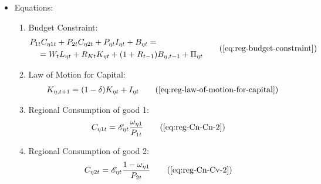 \documentclass[../thesis.tex]{subfiles}
\begin{document}
{\begin{itemize}
		\item Equations:
		
	\begin{enumerate}

		\item Budget Constraint:
		\begin{align}
		\begin{split}
			& P_{1 t} C_{\eta 1 t} + P_{2 t} C_{\eta 2 t} + P_{\eta t} I_{\eta t} + B_{\eta t} = \\ & \quad = W_t L_{\eta t} + R_{Kt} K_{\eta t} + (1 + R_{t-1}) B_{\eta,t-1} + \Pi_{\eta t}
		\end{split} \tag{\ref{eq:reg-budget-constraint}}
		\end{align}

		\item Law of Motion for Capital:
		\begin{align}
			K_{\eta, t+1} = (1-\delta)K_{\eta t} + I_{\eta t} \tag{\ref{eq:reg-law-of-motion-for-capital}}
		\end{align}

		\item Regional Consumption of good 1:
		\begin{align}
			C_{\eta 1 t} &= \te \frac{\omega_{\eta 1}}{P_{1 t}} \tag{\ref{eq:reg-Cn-Cn-2}}
		\end{align}

		\item Regional Consumption of good 2:
		\begin{align}
			C_{\eta 2 t} &= \te \frac{1 -\omega_{\eta 1}}{P_{2 t}} \tag{\ref{eq:reg-Cn-Cv-2}}
		\end{align}

\begin{comment}
	
	\item Regional Consumption:
	\begin{align}
		C_{\eta t} = C_{\eta 1 t}^{\omega_{\eta 1}} C_{\eta 2 t}^{1-\omega_{\eta 1}} \tag{\ref{eq:reg-consumption-aggregation}}
	\end{align}

	\item Relative Consumption of Regional Goods:
	\begin{align}
		\frac{C_{\eta 1 t}}{C_{\eta 2 t}} = \frac{P_{\nu t}}{P_{\eta t}} \cdot \frac{\omega_{\eta 1}}{1 -\omega_{\eta 1}} \tag{\ref{eq:reg-FOC-C1-C2}}
	\end{align}	
	
\end{comment}


\end{enumerate}
\end{itemize}}
\end{document}
